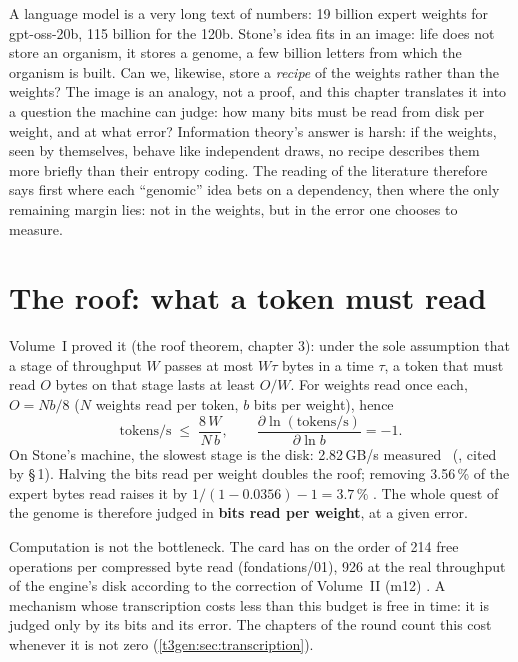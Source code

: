 \begin{enbref}
A language model is a very long text of numbers: 19 billion expert weights for gpt-oss-20b, 115 billion for the 120b. Stone's idea fits in an image: life does not store an organism, it stores a genome, a few billion letters from which the organism is built. Can we, likewise, store a \emph{recipe} of the weights rather than the weights? The image is an analogy, not a proof, and this chapter translates it into a question the machine can judge: how many bits must be read from disk per weight, and at what error? Information theory's answer is harsh: if the weights, seen by themselves, behave like independent draws, no recipe describes them more briefly than their entropy coding. The reading of the literature therefore says first where each ``genomic'' idea bets on a dependency, then where the only remaining margin lies: not in the weights, but in the error one chooses to measure.
\end{enbref}

\section{The roof: what a token must read}\label{t3que:sec:toit}

Volume~I proved it (the roof theorem, chapter 3): under the sole assumption that a stage of throughput $W$ passes at most $W\tau$ bytes in a time $\tau$, a token that must read $O$ bytes on that stage lasts at least $O/W$. For weights read once each, $O = N b / 8$ ($N$ weights read per token, $b$ bits per weight), hence
\begin{equation}\label{t3que:eq:toit}
\text{tokens/s} \;\le\; \frac{8\,W}{N\,b}, \qquad \frac{\partial \ln(\text{tokens/s})}{\partial \ln b} = -1 .
\end{equation}
On Stone's machine, the slowest stage is the disk: 2.82\,GB/s measured \mes~(, cited by  §\,1). Halving the bits read per weight doubles the roof; removing 3.56\,\% of the expert bytes read raises it by $1/(1 - 0.0356) - 1 = 3.7\,\%$ \calc. The whole quest of the genome is therefore judged in \textbf{bits read per weight}, at a given error.

Computation is not the bottleneck. The card has on the order of 214 free operations per compressed byte read (fondations/01), 926 at the real throughput of the engine's disk according to the correction of Volume~II (m12) \calc. A mechanism whose transcription costs less than this budget is free in time: it is judged only by its bits and its error. The chapters of the round count this cost whenever it is not zero (\cref{t3gen:sec:transcription}).


